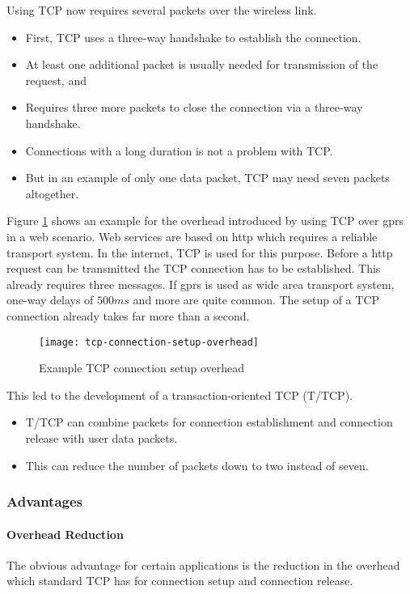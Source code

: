 Using TCP now requires several packets over the wireless link. 

\begin{itemize}
	\item First, TCP uses a three-way handshake to establish the connection.
	\item At least one additional packet is usually needed for transmission of the request, and 
	\item Requires three more packets to close the connection via a three-way handshake.
	\item Connections with a long duration is not a problem with TCP. 
	\item But in an example of only one data packet, TCP may need seven packets altogether.
\end{itemize}

Figure {\ref{fig:tcp_connection_setup_overhead}} shows an example for the overhead introduced by using TCP over \gls{gprs} in a web scenario. Web services are based on \gls{http} which requires a reliable transport system. In the internet, TCP is used for this purpose. Before a \gls{http} request can be transmitted the TCP connection has to be established. This already requires three messages. If \gls{gprs} is used as wide area transport system, one-way delays of \(500 ms\) and more are quite common. The setup of a TCP connection already takes far more than a second.

\begin{figure}[ht!]
	\centering
	\texttt{[image: tcp-connection-setup-overhead]}
	\caption{Example TCP connection setup overhead}\label{fig:tcp_connection_setup_overhead}
\end{figure}


This led to the development of a transaction-oriented TCP (T/TCP). 
\begin{itemize}
	\item T/TCP can combine packets for connection establishment and connection release with user data packets. 
	\item This can reduce the number of packets down to two instead of seven.
\end{itemize}

\subsubsection{Advantages}
\paragraph*{Overhead Reduction}
The obvious advantage for certain applications is the reduction in the overhead which standard TCP has for connection setup and connection release. 

